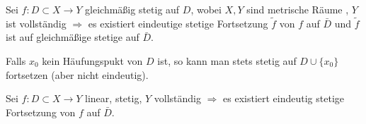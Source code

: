 \begin{proposition}
    Sei $f: D \subset X \to Y$ gleichmäßig stetig auf $D$, wobei $X,Y$  sind metrische Räume , $Y$ ist vollständig $\Rightarrow$ es existiert eindeutige stetige Fortsetzung $\tilde{f}$ von $f$ auf $\bar{D}$ und $\tilde{f}$ ist auf gleichmäßige stetige auf $\bar{D}$.
\end{proposition}

\begin{*remark}
    Falls $x_0$ kein Häufungspukt von $D$ ist, so kann man stets stetig auf $D\cup \{x_0\}$ fortsetzen (aber nicht eindeutig).
\end{*remark}

\addtocounter{theorem}{6}

\begin{conclusion}
    Sei $f: D \subset X \to Y$ linear, stetig, $Y$ vollständig $\Rightarrow$ es existiert eindeutig stetige Fortsetzung von $f$ auf $\bar{D}$.
\end{conclusion}